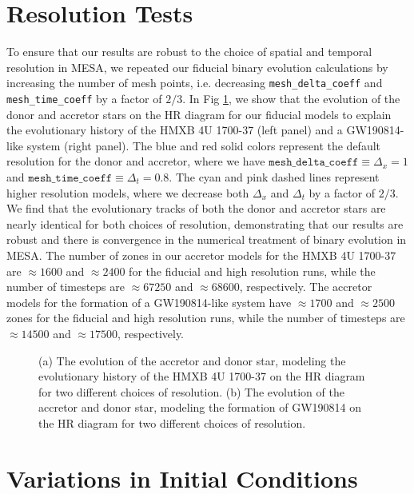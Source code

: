 \documentclass[linenumbers,trackchanges,twocolumn]{aastex701}
\begin{document}
\section{Resolution Tests} \label{resolution}

To ensure that our results are robust to the choice of spatial and
temporal resolution in \textsc{MESA}, we
repeated our fiducial binary evolution calculations by increasing the number of mesh points, i.e. decreasing \texttt{mesh\_delta\_coeff} and \texttt{mesh\_time\_coeff} by a factor of $2/3$. In Fig \ref{fig:resolution_test}, we show that the evolution of the donor and accretor stars on the HR diagram for our fiducial models to explain the evolutionary history of the HMXB 4U 1700-37 (left panel) and a GW190814-like system (right panel). The blue and red solid colors represent the default resolution for the donor and accretor, where we have $\mathrm{\texttt{mesh\_delta\_coeff}} \equiv \Delta_x = 1$ and $\mathrm{\texttt{mesh\_time\_coeff}} \equiv \Delta_t = 0.8$. The cyan and pink dashed lines represent higher resolution models, where we decrease both $\Delta_x$ and $\Delta_t$ by a factor of $2/3$. We find that the evolutionary tracks of both the donor and accretor stars are nearly identical for both choices of resolution, demonstrating that our results are robust and there is convergence in the numerical treatment of binary evolution in \textsc{MESA}. The number of zones in our accretor models for the HMXB 4U 1700-37 are $\approx 1600$ and $\approx 2400$ for the fiducial and high resolution runs, while the number of timesteps are $\approx 67250$ and $\approx 68600$, respectively. The accretor models for the formation of a GW190814-like system have $\approx 1700$ and $\approx 2500$ zones for the fiducial and high resolution runs, while the number of timesteps are $\approx 14500$ and $\approx 17500$, respectively.

\begin{figure}
\caption{(a) The evolution of the accretor and donor star, modeling the evolutionary history of the HMXB 4U 1700-37 on the HR diagram for two different choices of resolution. (b) The evolution of the accretor and donor star, modeling the formation of GW190814 on the HR diagram for two different choices of resolution.} \label{fig:resolution_test}
\end{figure}

\section{Variations in Initial Conditions} \label{grid}
\end{document}
